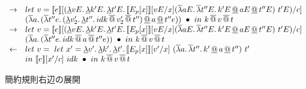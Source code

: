 \begin{figure}
\[\begin{array}{cl}
  \to & let\ v = \CPSTh{e}[\Change{c}{\DLamP{vE}{\DLam{k'E}{\DLam{t'E}{\CPSTh{E_p[x]}[\Change{x}{vE}] \SLamP{aE}{\SLam{t''E}{k'E \DAppS aE \DAppS t''E}}\ t'E}}}}]\\
        & \SLamP{a}{\SLamP{t''e}{\DLamP{v_2'}{\DLam{t''}
              {\SApp{\SApp{idk}{v_2'}}{t''}}} \DAppS a \DAppS t''e}}\ \bullet
  \ in\
  k\SAppS v \SAppS t\\

  \to & let\ v = \CPSTh{e}[\Change{c}{\DLamP{vE}{\DLam{k'E}{\DLam{t'E}{\CPSTh{E_p[x]}[\Change{x}{vE}] \SLamP{aE}{\SLam{t''E}{k'E \DAppS aE \DAppS t''E}}\ t'E}}}}]\\
        & \SLamP{a}{\SLamP{t''e}{
              \SApp{\SApp{idk}{a}}{t''e}}}\ \bullet
  \ in\
  k\SAppS v \SAppS t\\

  \leftarrow & let\ v =\ let\ x'=
  \DLam{v'}{\DLam{k'}{\DLam{t'}{\CPSTh{E_p[x]}[\Change{x}{v'}]\
        \SLamP{a}{\SLam{t''}{k' \DAppS a \DAppS t''}}\ t'}}}\ \\
  & in\ \CPSTh{e}[\Change{c}{x'}]\
  idk\ \bullet \ in\ k\SAppS v \SAppS t\\
\end{array}
\]
\caption{簡約規則右辺の展開}
\label{ControlReRight}
\end{figure}


